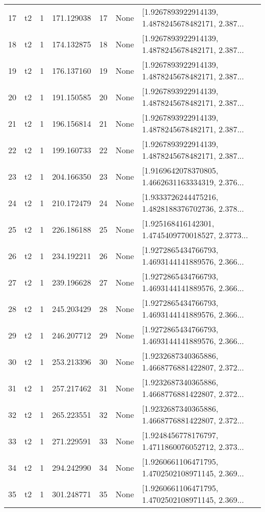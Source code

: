 \begin{tabular}{lllrlll}
17  &  t2 &   1 &   171.129038 &   17 &  None &  [1.9267893922914139, 1.4878245678482171, 2.387... \\
18  &  t2 &   1 &   174.132875 &   18 &  None &  [1.9267893922914139, 1.4878245678482171, 2.387... \\
19  &  t2 &   1 &   176.137160 &   19 &  None &  [1.9267893922914139, 1.4878245678482171, 2.387... \\
20  &  t2 &   1 &   191.150585 &   20 &  None &  [1.9267893922914139, 1.4878245678482171, 2.387... \\
21  &  t2 &   1 &   196.156814 &   21 &  None &  [1.9267893922914139, 1.4878245678482171, 2.387... \\
22  &  t2 &   1 &   199.160733 &   22 &  None &  [1.9267893922914139, 1.4878245678482171, 2.387... \\
23  &  t2 &   1 &   204.166350 &   23 &  None &  [1.9169642078370805, 1.4662631163334319, 2.376... \\
24  &  t2 &   1 &   210.172479 &   24 &  None &  [1.9333726244475216, 1.4828188376702736, 2.378... \\
25  &  t2 &   1 &   226.186188 &   25 &  None &  [1.925168416142301, 1.4745409770018527, 2.3773... \\
26  &  t2 &   1 &   234.192211 &   26 &  None &  [1.9272865434766793, 1.4693144141889576, 2.366... \\
27  &  t2 &   1 &   239.196628 &   27 &  None &  [1.9272865434766793, 1.4693144141889576, 2.366... \\
28  &  t2 &   1 &   245.203429 &   28 &  None &  [1.9272865434766793, 1.4693144141889576, 2.366... \\
29  &  t2 &   1 &   246.207712 &   29 &  None &  [1.9272865434766793, 1.4693144141889576, 2.366... \\
30  &  t2 &   1 &   253.213396 &   30 &  None &  [1.9232687340365886, 1.4668776881422807, 2.372... \\
31  &  t2 &   1 &   257.217462 &   31 &  None &  [1.9232687340365886, 1.4668776881422807, 2.372... \\
32  &  t2 &   1 &   265.223551 &   32 &  None &  [1.9232687340365886, 1.4668776881422807, 2.372... \\
33  &  t2 &   1 &   271.229591 &   33 &  None &  [1.9248456778176797, 1.4711860076052712, 2.373... \\
34  &  t2 &   1 &   294.242990 &   34 &  None &  [1.9260661106471795, 1.4702502108971145, 2.369... \\
35  &  t2 &   1 &   301.248771 &   35 &  None &  [1.9260661106471795, 1.4702502108971145, 2.369... \\

\end{tabular}
